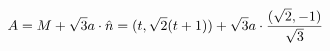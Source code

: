\documentclass[preview]{standalone}
\begin{document}
\begin{align*}
\special{dvisvgm:raw <g id='unique000'>}A=M+\sqrt{3}a\cdot\hat{n}=(t,\sqrt{2}(t+1))+\sqrt{3}a\cdot\frac{(\sqrt{2},-1)}{\sqrt{3}}\special{dvisvgm:raw </g>}
\end{align*}
\end{document}

